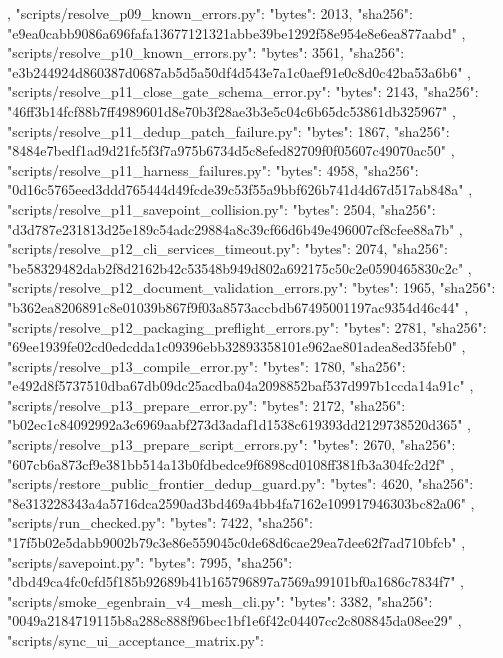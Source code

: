 {{{    },
    "scripts/resolve_p09_known_errors.py": {
      "bytes": 2013,
      "sha256": "e9ea0cabb9086a696fafa13677121321abbe39be1292f58e954e8e6ea877aabd"
    },
    "scripts/resolve_p10_known_errors.py": {
      "bytes": 3561,
      "sha256": "e3b244924d860387d0687ab5d5a50df4d543e7a1c0aef91e0c8d0c42ba53a6b6"
    },
    "scripts/resolve_p11_close_gate_schema_error.py": {
      "bytes": 2143,
      "sha256": "46ff3b14fcf88b7ff4989601d8e70b3f28ae3b3e5c04c6b65dc53861db325967"
    },
    "scripts/resolve_p11_dedup_patch_failure.py": {
      "bytes": 1867,
      "sha256": "8484e7bedf1ad9d21fc5f3f7a975b6734d5c8efed82709f0f05607c49070ac50"
    },
    "scripts/resolve_p11_harness_failures.py": {
      "bytes": 4958,
      "sha256": "0d16c5765eed3ddd765444d49fcde39c53f55a9bbf626b741d4d67d517ab848a"
    },
    "scripts/resolve_p11_savepoint_collision.py": {
      "bytes": 2504,
      "sha256": "d3d787e231813d25e189c54adc29884a8c39cf66d6b49e496007cf8cfee88a7b"
    },
    "scripts/resolve_p12_cli_services_timeout.py": {
      "bytes": 2074,
      "sha256": "be58329482dab2f8d2162b42c53548b949d802a692175c50c2e0590465830c2c"
    },
    "scripts/resolve_p12_document_validation_errors.py": {
      "bytes": 1965,
      "sha256": "b362ea8206891c8e01039b867f9f03a8573accbdb67495001197ac9354d46c44"
    },
    "scripts/resolve_p12_packaging_preflight_errors.py": {
      "bytes": 2781,
      "sha256": "69ee1939fe02cd0edcdda1c09396ebb32893358101e962ae801adea8ed35feb0"
    },
    "scripts/resolve_p13_compile_error.py": {
      "bytes": 1780,
      "sha256": "e492d8f5737510dba67db09dc25acdba04a2098852baf537d997b1ccda14a91c"
    },
    "scripts/resolve_p13_prepare_error.py": {
      "bytes": 2172,
      "sha256": "b02ec1c84092992a3c6969aabf273d3adaf1d1538c619393dd2129738520d365"
    },
    "scripts/resolve_p13_prepare_script_errors.py": {
      "bytes": 2670,
      "sha256": "607cb6a873cf9e381bb514a13b0fdbedce9f6898cd0108ff381fb3a304fc2d2f"
    },
    "scripts/restore_public_frontier_dedup_guard.py": {
      "bytes": 4620,
      "sha256": "8e313228343a4a5716dca2590ad3bd469a4bb4fa7162e109917946303bc82a06"
    },
    "scripts/run_checked.py": {
      "bytes": 7422,
      "sha256": "17f5b02e5dabb9002b79c3e86e559045c0de68d6cae29ea7dee62f7ad710bfcb"
    },
    "scripts/savepoint.py": {
      "bytes": 7995,
      "sha256": "dbd49ca4fc0cfd5f185b92689b41b165796897a7569a99101bf0a1686c7834f7"
    },
    "scripts/smoke_egenbrain_v4_mesh_cli.py": {
      "bytes": 3382,
      "sha256": "0049a2184719115b8a288c888f96bec1bf1e6f42c04407cc2c808845da08ee29"
    },
    "scripts/sync_ui_acceptance_matrix.py": {
}}}
